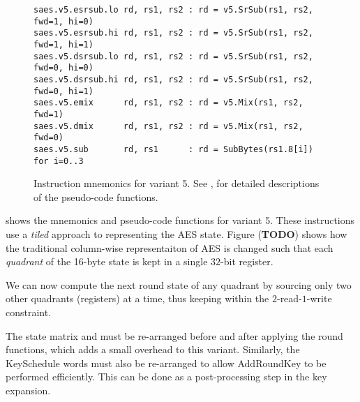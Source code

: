 
\begin{figure}
\begin{lstlisting}[language=pseudo,style=block]
saes.v5.esrsub.lo rd, rs1, rs2 : rd = v5.SrSub(rs1, rs2, fwd=1, hi=0)
saes.v5.esrsub.hi rd, rs1, rs2 : rd = v5.SrSub(rs1, rs2, fwd=1, hi=1)
saes.v5.dsrsub.lo rd, rs1, rs2 : rd = v5.SrSub(rs1, rs2, fwd=0, hi=0)
saes.v5.dsrsub.hi rd, rs1, rs2 : rd = v5.SrSub(rs1, rs2, fwd=0, hi=1)
saes.v5.emix      rd, rs1, rs2 : rd = v5.Mix(rs1, rs2, fwd=1)
saes.v5.dmix      rd, rs1, rs2 : rd = v5.Mix(rs1, rs2, fwd=0)
saes.v5.sub       rd, rs1      : rd = SubBytes(rs1.8[i])         for i=0..3
\end{lstlisting}
\caption{
    Instruction mnemonics for variant 5.
    See ,  for detailed
    descriptions of the pseudo-code functions.
}
\label{fig:mnemonics:v5}
\end{figure}

 shows the mnemonics and pseudo-code functions
for variant 5.
These instructions use a {\em tiled} approach to representing the
AES state.
Figure ({\bf TODO}) shows how the traditional column-wise representaiton
of AES is changed such that each {\em quadrant} of the 16-byte state
is kept in a single $32$-bit register.

We can now compute the next round state of any quadrant by sourcing
only two other quadrants (registers) at a time, thus keeping within
the $2$-read-$1$-write constraint.

The state matrix and must be re-arranged before and after applying
the round functions, which adds a small overhead to this variant.
Similarly, the KeySchedule words must also be re-arranged to allow
AddRoundKey to be performed efficiently.
This can be done as a post-processing step in the key expansion.

